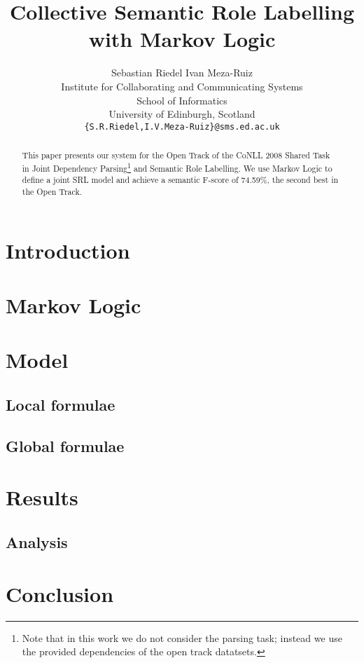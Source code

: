\documentclass[11pt]{article}
\title{Collective Semantic Role Labelling with Markov Logic}
\author{Sebastian Riedel \qquad Ivan Meza-Ruiz\\
  Institute for Collaborating and Communicating Systems\\
  School of Informatics\\
  University of Edinburgh, Scotland\\
  {\tt\{S.R.Riedel,I.V.Meza-Ruiz\}@sms.ed.ac.uk} }
\date{}
\begin{document}
 


\maketitle
\begin{abstract}
This paper presents our system for the Open Track of the CoNLL 2008 Shared Task~\citep{surdeanu08conll} in Joint Dependency Parsing\footnote{Note that in this work we do not consider the parsing task; instead we use the provided dependencies of the open track datatsets.} and Semantic Role Labelling. We use Markov Logic to define a joint SRL model and achieve a semantic F-score of 74.59\%, the second best in the Open Track.
\end{abstract}

\section{Introduction}



\section{Markov Logic} \label{sec:markovlogic}



\section{Model} \label{sec:model} 


\subsection{Local formulae}



\subsection{Global formulae}



\section{Results}\label{sec:results}


\subsection{Analysis}


\section{Conclusion} \label{sec:conclusion}




\end{document}
